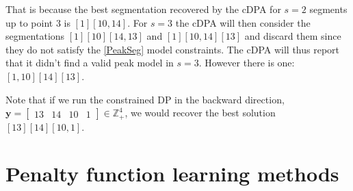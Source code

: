 \documentclass{article}
\newcommand{\ZZ}{\mathbb Z}
\begin{document}
That is because the best segmentation recovered by the cDPA for $s=2$
segments up to point $3$ is $[1][10, 14]$.
For $s=3$ the cDPA will then consider the segmentations $[1][10][14,
13]$ and $[1][10, 14][13]$ and discard them since they do not satisfy
the \ref{PeakSeg} model constraints. The cDPA will thus report that it
didn't find a valid peak model in $s=3$. However there is one: $[1,
10][14][13]$.

Note that if we run the constrained DP in the backward direction, 
$\mathbf y = \left[\begin{array}{cccc} 13 & 14 & 10 & 1
\end{array}\right]\in\ZZ_+^4
$, we would recover the best solution $[13][14][10, 1]$.







\section{Penalty function learning methods}
\label{sec:penalty-learning}
\end{document}
